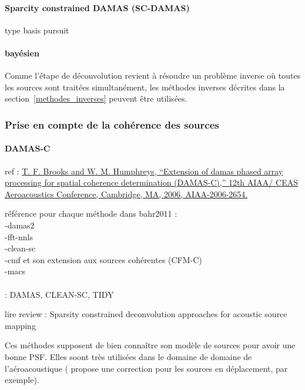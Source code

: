\paragraph{Sparcity constrained DAMAS (SC-DAMAS)}
\cite{Yardibi2008}

type basis pursuit

\paragraph{bayésien}


Comme l'étape de déconvolution revient à résoudre un problème inverse où toutes les sources sont traitées simultanément, les méthodes inverses décrites dans la section~\ref{methodes_inverses} peuvent être utilisées.


\subsubsection{Prise en compte de la cohérence des sources}








\paragraph{DAMAS-C}
ref : \url{ T. F. Brooks and W. M. Humphreys, “Extension of damas phased array processing for spatial coherence determination (DAMAS-C),” 12th AIAA/ CEAS Aeroacoustics Conference, Cambridge, MA, 2006, AIAA-2006-2654.}



référence pour chaque méthode dans bahr2011 : \\
-damas2\\

-fft-nnls\\

-clean-sc\\

-cmf et son extension aux sources cohérentes (CFM-C) \cite{Yardibi2008} \\



-macs\\


~\\  : DAMAS, CLEAN-SC, TIDY

lire review : Sparsity constrained deconvolution approaches for acoustic
source mapping


Ces méthodes supposent de bien connaître son modèle de sources pour avoir une bonne PSF. Elles soont très utilisées dans le domaine de domaine de l'aéroacoustique (\cite{Fleury2012} propose une correction pour les sources en déplacement, par exemple).

